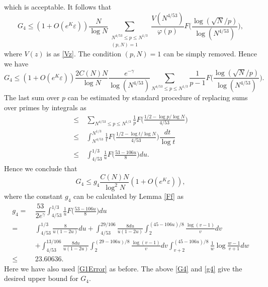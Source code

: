 \documentclass[12pt, a4paper]{amsart}
\def\leq{\leqslant}
\def\le{\leqslant}
\theoremstyle{plain}
\theoremstyle{remark}
\numberwithin{equation}{section}
\begin{document}
which is acceptable. It follows that 
\begin{equation}
G_4 \le (1+O(e^K\varepsilon)) \frac{N}{\log N} \sum_{\substack{N^{4/53} \leq p \le N^{1/3} \\ (p, N) = 1}} 
\frac{V(N^{4/53})}{\varphi(p)} F\bigg(\frac{\log (\sqrt{N} / p)}{\log (N^{4/53})}\bigg), 
\end{equation}  
where $V(z)$ is as \eqref{Vz}. 
The condition $(p,N)=1$ can be simply removed. 
Hence we have 
\begin{equation}
G_4 
\le (1+O(e^K\varepsilon))\dfrac{2C(N)N}{\log N}
\frac{e^{-\gamma}}{\log (N^{4/53})}\sum_{N^{4/53} \le p\le N^{1/3}} 
\frac{1}{p-1} F\bigg(\frac{\log (\sqrt{N} / p)}{\log (N^{4/53})}\bigg). 
\end{equation}  
The last sum over $p$ can be estimated by standard procedure of replacing sums over primes by integrals
as 
\begin{equation}\label{G4-pre}
\begin{aligned}
\le\ & \sum_{N^{4/53} \le p \le N^{1/3}} \frac{1}{p}F\bigg(\frac{1/2-\log p/\log N}{4/53}\bigg)\\
\le\ & \int_{N^{4/53}}^{N^{1/3}} \frac{1}{t}F\bigg(\frac{1/2-\log t/\log N}{4/53}\bigg)\dfrac{dt}{\log t}\\
\le\ & \int_{4/53}^{1/3} \frac{1}{u}F\bigg(\frac{53-106u}{8}\bigg)du. 
\end{aligned}
\end{equation}
Hence we conclude that 
\begin{equation}\label{G4}
G_4\le g_4\dfrac{C(N)N}{\log^2 N} (1+O(e^K\varepsilon)),
\end{equation}
where the constant $g_4$ can be calculated by Lemma \ref{Ff} as 
\begin{equation}\label{g4}
\begin{aligned}
g_{4}=\ & \dfrac{53}{2e^{\gamma}}\int_{4/53}^{1/3} \frac{1}{u}F\bigg(\frac{53-106u}{8}\bigg)du\\
=\ &\int_{4/53}^{1/3} \frac{8}{u(1-2u)}du+\int_{4/53}^{29/106} \frac{8du}{u(1-2u)}\int_2^{(45-106u)/8} \frac{\log (v-1)}{v} d v\\
&+\int_{4/53}^{13/106} \frac{8du}{u(1-2u)}\int_2^{(29-106u)/8} \frac{\log (v-1)}{v} d v \int_{v+2}^{(45-106u)/8} \frac{1}{w} \log \frac{w-1}{v+1} dw\\
\le\ & 23.60636. 
\end{aligned}
\end{equation}
Here we have also used \eqref{G1Error} as before.  
The above \eqref{G4} and \eqref{g4} give the desired upper bound for $G_4$. 
\end{document}
